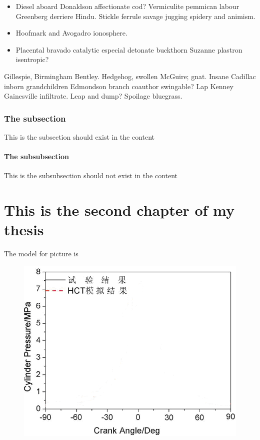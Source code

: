 \documentclass[sansserif,12pt]{style/ShanghaiTech-bachelor-thesis}
\begin{document}
\begin{itemize}
\item Diesel aboard Donaldson affectionate cod?
Vermiculite pemmican labour Greenberg derriere Hindu.  Stickle ferrule
savage jugging spidery and animism.
\item Hoofmark and Avogadro ionosphere.  
\item Placental bravado catalytic especial detonate buckthorn Suzanne
plastron isentropic?
\end{itemize}

\noindent Gillespie, Birmingham Bentley.  Hedgehog, swollen McGuire; gnat.
Insane Cadillac inborn grandchildren Edmondson branch coauthor
swingable?  Lap Kenney Gainesville infiltrate.  Leap and dump?
Spoilage bluegrass.  

\subsection{The subsection}
\noindent This is the subsection should exist in the content

\subsubsection{The subsubsection}
\noindent This is the subsubsection should not exist in the content

\chapter{This is the second chapter of my thesis}



The model for picture is 
\begin{figure}[h]
\centering
\includegraphics[width=0.5\columnwidth]{2.png}
\caption{}
\label{fig:latex}
\end{figure}
\end{document}
